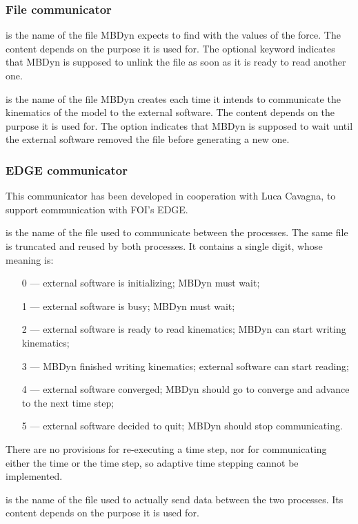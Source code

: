 \subsubsection{File communicator}
 is the name of the file MBDyn expects to find
with the values of the force.
The content depends on the purpose it is used for.
The optional keyword  indicates that MBDyn is supposed
to unlink the file as soon as it is ready to read another one.

 is the name of the file MBDyn creates
each time it intends to communicate the kinematics of the model
to the external software.
The content depends on the purpose it is used for.
The option  indicates that MBDyn is supposed to wait
until the external software removed the file before generating a new one.



\subsubsection{EDGE communicator}
This communicator has been developed in cooperation with Luca Cavagna,
to support communication with FOI's EDGE.

 is the name of the file used to communicate
between the processes.
The same file is truncated and reused by both processes.
It contains a single digit, whose meaning is:
\begin{itemize}
\item[0 ---] external software is initializing; MBDyn must wait;
\item[1 ---] external software is busy; MBDyn must wait;
\item[2 ---] external software is ready to read kinematics; MBDyn can start writing kinematics;
\item[3 ---] MBDyn finished writing kinematics; external software can start reading;
\item[4 ---] external software converged; MBDyn should go to converge and advance to the next time step;
\item[5 ---] external software decided to quit; MBDyn should stop communicating.
\end{itemize}
There are no provisions for re-executing a time step,
nor for communicating either the time or the time step,
so adaptive time stepping cannot be implemented.

 is the name of the file used to actually send data
between the two processes.
Its content depends on the purpose it is used for.



